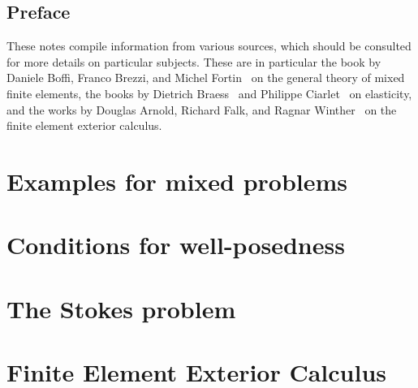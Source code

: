 \maketitle

\section*{Preface}
%

These notes compile information from various sources, which should be
consulted for more details on particular subjects. These are in
particular the book by Daniele Boffi, Franco Brezzi, and Michel
Fortin~\cite{BoffiBrezziFortin13} on the general theory of mixed
finite elements, the books by Dietrich Braess~\cite{Braess97,Braess13}
and Philippe Ciarlet~\cite{Ciarlet88} on elasticity, and the works by
Douglas Arnold, Richard Falk, and Ragnar
Winther~\cite{ArnoldFalkWinther06acta,ArnoldFalkWinther10} on the
finite element exterior calculus.

\thispagestyle{empty}
\setcounter{page}{0}


\tableofcontents

\chapter{Examples for mixed problems}


\chapter{Conditions for well-posedness}


\chapter{The Stokes problem}


\chapter{Finite Element Exterior Calculus}


\printbibliography
\printindex


